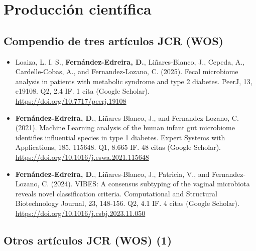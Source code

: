 

\chapter{Producción científica}
\label{chap:apendices}


\section{Compendio de tres artículos JCR (WOS)}
\begin{itemize}

    \item Loaiza, L. I. S., \textbf{Fernández-Edreira, D.}, Liñares-Blanco, J., Cepeda, A., Cardelle-Cobas, A., and Fernandez-Lozano, C. (2025). Fecal microbiome analysis in patients with metabolic syndrome and type 2 diabetes. PeerJ, 13, e19108. Q2, 2.4 IF. 1 cita (Google Scholar). \url{https://doi.org/10.7717/peerj.19108}
    
    \item \textbf{Fernández-Edreira, D.}, Liñares-Blanco, J., and Fernandez-Lozano, C. (2021). Machine Learning analysis of the human infant gut microbiome identifies influential species in type 1 diabetes. Expert Systems with Applications, 185, 115648. Q1, 8.665 IF. 48 citas (Google Scholar). \url{https://doi.org/10.1016/j.eswa.2021.115648}

    \item \textbf{Fernández-Edreira, D.}, Liñares-Blanco, J., Patricia, V., and Fernandez-Lozano, C. (2024). VIBES: A consensus subtyping of the vaginal microbiota reveals novel classification criteria. Computational and Structural Biotechnology Journal, 23, 148-156. Q2, 4.1 IF. 4 citas (Google Scholar). \url{https://doi.org/10.1016/j.csbj.2023.11.050}

    
\end{itemize}

\section{Otros artículos JCR (WOS) (1)}

